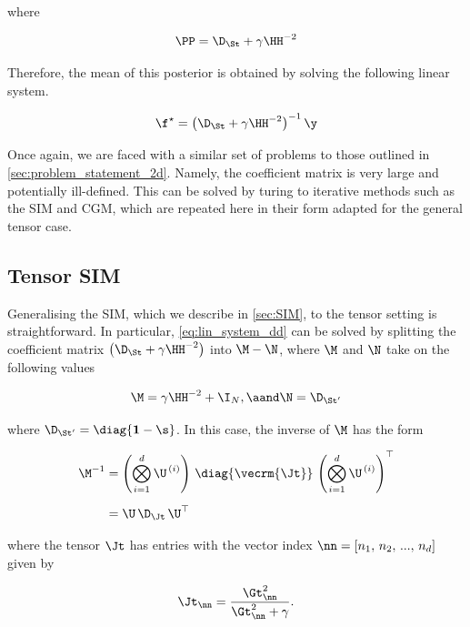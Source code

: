where 

\begin{equation}
    \PP = \D_{\St} + \gamma \HH^{-2}
\end{equation}

Therefore, the mean of this posterior is obtained by solving the following linear system.

\begin{equation}
    \label{eq:lin_system_dd}
    \f^{\star} = \left(\D_\St + \gamma \HH^{-2}\right)^{-1} \y
\end{equation}

Once again, we are faced with a similar set of problems to those outlined in \cref{sec:problem_statement_2d}. Namely, the coefficient matrix is very large and potentially ill-defined. This can be solved by turing to iterative methods such as the SIM and CGM, which are repeated here in their form adapted for the general tensor case. 

\subsection{Tensor SIM}

\label{sec:SIM_dd}

Generalising the SIM, which we describe in \cref{sec:SIM}, to the tensor setting is straightforward. In particular, \cref{eq:lin_system_dd} can be solved by splitting the coefficient matrix $\left(\D_\St + \gamma \HH^{-2}\right)$ into $\M - \N$, where $\M$ and $\N$ take on the following values
 
\begin{equation}
    \M = \gamma \HH^{-2} + \I_N, \aand \N = \D_{\St'}
\end{equation}

where $\D_{\St'} = \diag{\mathbf{1} - \s}$. In this case, the inverse of $\M$ has the form 


\begin{align}
\M^{-1} &= \left( \bigotimes_{i=1}^d  \U^{\,(i)} \right) \, \diag{\vecrm{\Jt}}\, \left(\bigotimes_{i=1}^d  \U^{\,(i)} \right)^\top \notag \\[0.2cm]
&= \U \, \D_\Jt \, \U^\top
\end{align}

where the tensor $\Jt$ has entries with the vector index $\nn = [n_1,\, n_2,\, ...,\, n_d]$ given by 

\begin{equation}
    \Jt_{\nn} = \frac{\Gt_{\nn}^2}{\Gt_{\nn}^2 + \gamma}.
\end{equation}

